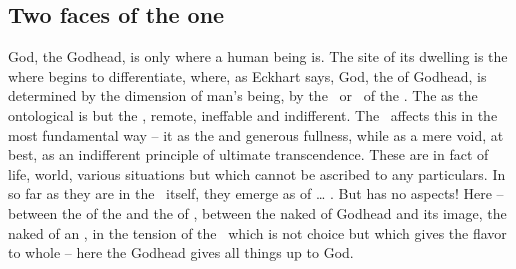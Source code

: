 
\subsection{Two faces of the one}

\pa God, the  Godhead, is only where a human being is. The site
of its dwelling is the  where 
begins to differentiate, where, as Eckhart says,   God, the  of Godhead, is determined by the
 dimension of man's being, by the \yes\ or \No\ of the \sch.  The
 as the ontological  is but the 
, remote, ineffable and indifferent.  The \sch\ affects this
 in the most fundamental way --  
it as the  and generous fullness, while  as a
mere void, at best, as an indifferent principle of ultimate transcendence. These
are in fact  of life, world, various situations but
 which cannot be ascribed to any particulars. In so far as they are
 in the \sch\ itself, they emerge as  of \ldots
{}. But  has no aspects! Here -- between the
 of the  and the  of ,
between the naked  of Godhead and its image, the naked  of an
, in the tension of the \sch\ which is not  choice but
which gives the flavor to  whole  -- here the Godhead gives
all things up to God.



